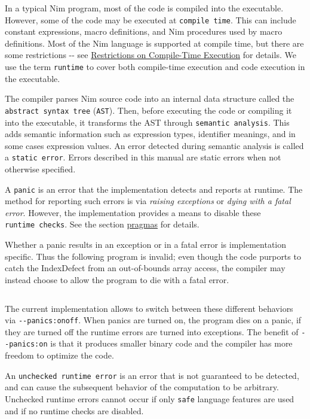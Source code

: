 In a typical Nim program, most of the code is compiled into the
executable. However, some of the code may be executed at
\texttt{compile\ time}. This can include constant expressions, macro
definitions, and Nim procedures used by macro definitions. Most of the
Nim language is supported at compile time, but there are some
restrictions -\/- see
\protect\hyperlink{restrictions-on-compileminustime-execution}{Restrictions
on Compile-Time Execution} for details. We use the term \texttt{runtime}
to cover both compile-time execution and code execution in the
executable.

The compiler parses Nim source code into an internal data structure
called the \texttt{abstract\ syntax\ tree} (\texttt{AST}). Then, before
executing the code or compiling it into the executable, it transforms
the AST through \texttt{semantic\ analysis}. This adds semantic
information such as expression types, identifier meanings, and in some
cases expression values. An error detected during semantic analysis is
called a \texttt{static\ error}. Errors described in this manual are
static errors when not otherwise specified.

A \texttt{panic} is an error that the implementation detects and reports
at runtime. The method for reporting such errors is via \emph{raising
exceptions} or \emph{dying with a fatal error}. However, the
implementation provides a means to disable these
\texttt{runtime\ checks}. See the section
\protect\hyperlink{pragmas}{pragmas} for details.

Whether a panic results in an exception or in a fatal error is
implementation specific. Thus the following program is invalid; even
though the code purports to catch the {IndexDefect} from an
out-of-bounds array access, the compiler may instead choose to allow the
program to die with a fatal error.

\begin{verbatim}
\end{verbatim}

The current implementation allows to switch between these different
behaviors via \texttt{-\/-panics:on\textbar{}off}. When panics are
turned on, the program dies on a panic, if they are turned off the
runtime errors are turned into exceptions. The benefit of
\texttt{-\/-panics:on} is that it produces smaller binary code and the
compiler has more freedom to optimize the code.

An \texttt{unchecked\ runtime\ error} is an error that is not guaranteed
to be detected, and can cause the subsequent behavior of the computation
to be arbitrary. Unchecked runtime errors cannot occur if only
\texttt{safe} language features are used and if no runtime checks are
disabled.

